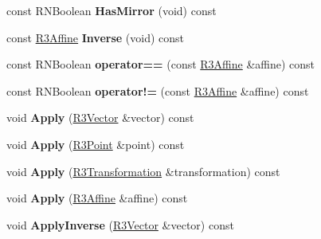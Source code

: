 \begin{DoxyCompactItemize}
\item 
const R\+N\+Boolean {\bfseries Has\+Mirror} (void) const \hypertarget{class_r3_affine_ab8670281671f71ddc8b5a5e77691bf16}{}\label{class_r3_affine_ab8670281671f71ddc8b5a5e77691bf16}

\item 
const \hyperlink{class_r3_affine}{R3\+Affine} {\bfseries Inverse} (void) const \hypertarget{class_r3_affine_a83b2f8ceac524a0944f8cf82ae312c89}{}\label{class_r3_affine_a83b2f8ceac524a0944f8cf82ae312c89}

\item 
const R\+N\+Boolean {\bfseries operator==} (const \hyperlink{class_r3_affine}{R3\+Affine} \&affine) const \hypertarget{class_r3_affine_a7858f1f15123b2d2d4cb5ba4d91f938f}{}\label{class_r3_affine_a7858f1f15123b2d2d4cb5ba4d91f938f}

\item 
const R\+N\+Boolean {\bfseries operator!=} (const \hyperlink{class_r3_affine}{R3\+Affine} \&affine) const \hypertarget{class_r3_affine_ae8d64376960133e8da6dbdc3f8097dda}{}\label{class_r3_affine_ae8d64376960133e8da6dbdc3f8097dda}

\item 
void {\bfseries Apply} (\hyperlink{class_r3_vector}{R3\+Vector} \&vector) const \hypertarget{class_r3_affine_a4e20260ca95f0565bbf0f39a4ccbb30f}{}\label{class_r3_affine_a4e20260ca95f0565bbf0f39a4ccbb30f}

\item 
void {\bfseries Apply} (\hyperlink{class_r3_point}{R3\+Point} \&point) const \hypertarget{class_r3_affine_ac99658f6d9833ac41a4d21c612dbe755}{}\label{class_r3_affine_ac99658f6d9833ac41a4d21c612dbe755}

\item 
void {\bfseries Apply} (\hyperlink{class_r3_transformation}{R3\+Transformation} \&transformation) const \hypertarget{class_r3_affine_a3e9db7a1073974bfbdf1d65632523288}{}\label{class_r3_affine_a3e9db7a1073974bfbdf1d65632523288}

\item 
void {\bfseries Apply} (\hyperlink{class_r3_affine}{R3\+Affine} \&affine) const \hypertarget{class_r3_affine_a05a31b85cacd826855bcafe29972448f}{}\label{class_r3_affine_a05a31b85cacd826855bcafe29972448f}

\item 
void {\bfseries Apply\+Inverse} (\hyperlink{class_r3_vector}{R3\+Vector} \&vector) const \hypertarget{class_r3_affine_a16fc8de7007337c4976a5dc713cfb43b}{}\label{class_r3_affine_a16fc8de7007337c4976a5dc713cfb43b}


\end{DoxyCompactItemize}

